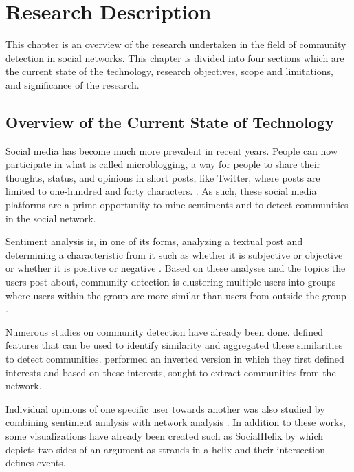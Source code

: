 %
%
%                 

\chapter{Research Description}
\label{sec:researchdesc}

This chapter is an overview of the research undertaken in the field of community detection in social networks. 
This chapter is divided into four sections which are the current state of the technology, research objectives, scope and limitations, and significance of the research.

\section{Overview of the Current State of Technology}
\label{sec:overview}

Social media has become much more prevalent in recent years. People can now participate in what is called microblogging, a way for people to share their thoughts, status, and opinions in short posts, like Twitter, where posts are limited to one-hundred and forty characters. \cite{Java:2007}. As such, these social media platforms are a prime opportunity to mine sentiments and to detect communities in the social network. 

Sentiment analysis is, in one of its forms, analyzing a textual post and determining a characteristic from it such as whether it is subjective or objective or whether it is positive or negative \cite{Deitrich:2013}. Based on these analyses and the topics the users post about, community detection is clustering multiple users into groups where users within the group are more similar than users from outside the group \cite{Tang:2010}.

Numerous studies on community detection have already been done.  defined features that can be used to identify similarity and aggregated these similarities to detect communities.  performed an inverted version in which they first defined interests and based on these interests, sought to extract communities from the network. 

Individual opinions of one specific user towards another was also studied by combining sentiment analysis with network analysis \cite{West:2014}. In addition to these works, some visualizations have already been created such as SocialHelix by  which depicts two sides of an argument as strands in a helix and their intersection defines events.

